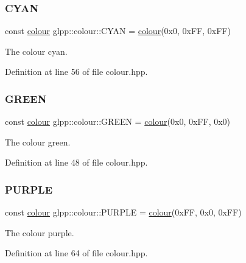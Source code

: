 \subsubsection{\texorpdfstring{C\+Y\+AN}{CYAN}}
{\footnotesize\ttfamily const \hyperlink{classglpp_1_1colour}{colour} glpp\+::colour\+::\+C\+Y\+AN = \hyperlink{classglpp_1_1colour}{colour}(0x0, 0x\+F\+F, 0x\+F\+F)\hspace{0.3cm}{\ttfamily [static]}}

The colour cyan. 

Definition at line 56 of file colour.\+hpp.

\mbox{\label{classglpp_1_1colour_ab673e5d7eb73740b26f7a6c16c013acc}} 
\subsubsection{\texorpdfstring{G\+R\+E\+EN}{GREEN}}
{\footnotesize\ttfamily const \hyperlink{classglpp_1_1colour}{colour} glpp\+::colour\+::\+G\+R\+E\+EN = \hyperlink{classglpp_1_1colour}{colour}(0x0, 0x\+F\+F, 0x0)\hspace{0.3cm}{\ttfamily [static]}}

The colour green. 

Definition at line 48 of file colour.\+hpp.

\mbox{\label{classglpp_1_1colour_a1c7c31cd3ab210492c25f09270648b95}} 
\subsubsection{\texorpdfstring{P\+U\+R\+P\+LE}{PURPLE}}
{\footnotesize\ttfamily const \hyperlink{classglpp_1_1colour}{colour} glpp\+::colour\+::\+P\+U\+R\+P\+LE = \hyperlink{classglpp_1_1colour}{colour}(0x\+F\+F, 0x0, 0x\+F\+F)\hspace{0.3cm}{\ttfamily [static]}}

The colour purple. 

Definition at line 64 of file colour.\+hpp.

\mbox{\label{classglpp_1_1colour_ad553b7109926527e6f04af61ec0f29fc}} 

